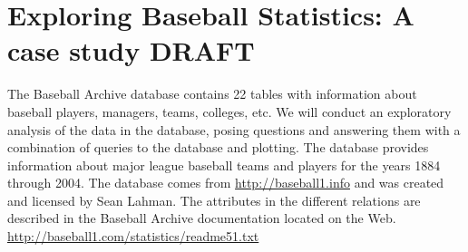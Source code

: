 








\section{Exploring Baseball Statistics: A case study DRAFT}

The Baseball Archive database contains 22 tables with
information about baseball players, managers, teams,
colleges, etc.  We will conduct an exploratory analysis of the
data in the database, posing questions and answering them
with a combination of queries to the database and 
plotting. 
The database provides information about major league baseball teams and
players for the years 1884 through 2004.  The database comes from
\url{http://baseball1.info} and
was created and licensed by Sean Lahman. 
The attributes in the different relations are described in
the Baseball Archive documentation located on the Web.
\\
\url{http://baseball1.com/statistics/readme51.txt} 

